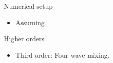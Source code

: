 \begin{frame}{Numerical setup}
  \begin{itemize}
  \item Assuming 
  \end{itemize}

\end{frame}


\begin{frame}{Higher orders}
  \begin{itemize}
  \item Third order: Four-wave mixing.
  \end{itemize}

\end{frame}



